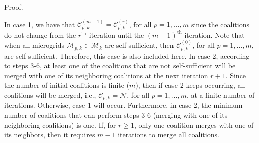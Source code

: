 \begin{pf*}{Proof.}
\begin{enumerate}
	 \end{enumerate}
	 In case 1, we have that $\mathcal{C}_{p,k}^{(m-1)}=\mathcal{C}_{p,k}^{(r)}$, for all $p=1,\dots,m$ since the coalitions do not change from the $r^{\mathrm{th}}$ iteration until the $(m-1)^{\mathrm{th}}$ iteration.  Note that when all microgrids  $\mathcal{M}_{p,k} \in\boldsymbol{\mathcal{M}}_k$ are self-sufficient, then $\mathcal{C}_{p,k}^{(0)}$, for all $p=1,\dots,m$, are self-sufficient. Therefore, this case is also included here. 
	 In case 2, according to steps 3-6, at least one of the coalitions that are not self-sufficient will be merged with one of its neighboring coalitions at the next iteration $r+1$. Since the number of initial coalitions is finite ($m$), then if case 2 keeps occurring, all coalitions will be merged, i.e., $\mathcal{C}_{p,k}=\mathcal{N}$, for all $p=1,\dots,m$, at a finite number of iterations. Otherwise, case 1 will occur. Furthermore, in case 2, the minimum number of coalitions that can perform steps 3-6 (merging with one of its neighboring coalitions) is one. If, for $r\geq1$, only one coalition merges with one of its neighbors, then it requires $m-1$ iterations to merge all coalitions. %
	  \eod \color{black}
\end{pf*}

